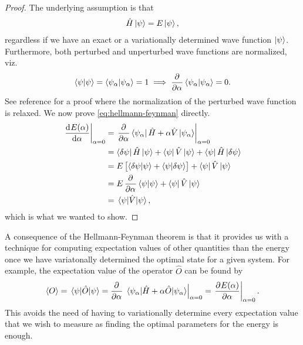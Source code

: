         \begin{proof}
            The underlying assumption is that
            \begin{align}
                \hat{H}\ket{\psi} = E\ket{\psi},
            \end{align}
            regardless if we have an exact or a variationally determined wave
            function $\ket{\psi}$.
            Furthermore, both perturbed and unperturbed wave functions are
            normalized, viz.
            \begin{align}
                \braket{\psi}{\psi} = \braket{\psi_{\alpha}}{\psi_{\alpha}} = 1
                \implies
                \dpd[]{}{\alpha} \braket{\psi_{\alpha}}{\psi_{\alpha}} = 0.
            \end{align}
            See reference \cite{helgaker-molecular} for a proof where the
            normalization of the perturbed wave function is relaxed.
            We now prove \autoref{eq:hellmann-feynman} directly.
            \begin{align}
                \left.\dod[]{E(\alpha)}{\alpha}\right\rvert_{\alpha = 0}
                &=
                \left.
                \dpd[]{}{\alpha}
                \bra{\psi_{\alpha}}\hamil + \alpha\hat{V}\ket{\psi_{\alpha}}
                \right\rvert_{\alpha = 0}
                \\
                &=
                \bra{\delta\psi}\hamil\ket{\psi}
                + \bra{\psi}\hat{V}\ket{\psi}
                + \bra{\psi}\hamil\ket{\delta\psi}
                \\
                &=
                \energy \brak{
                    \braket{\delta\psi}{\psi}
                    + \braket{\psi}{\delta\psi}
                }
                + \bra{\psi}\hat{V}\ket{\psi}
                \\
                &=
                \energy \dpd[]{}{\alpha}\braket{\psi}{\psi}
                + \bra{\psi}\hat{V}\ket{\psi}
                \\
                &=
                \mel{\psi}{\hat{V}}{\psi},
            \end{align}
            which is what we wanted to show.
        \end{proof}
        A consequence of the Hellmann-Feynman theorem is that it provides us
        with a technique for computing expectation values of other quantities
        than the energy once we have variatonally determined the optimal state
        for a given system.
        For example, the expectation value of the operator $\hat{O}$ can be
        found by
        \begin{align}
            \expval{O}
            = \mel{\psi}{\hat{O}}{\psi}
            = \dpd[]{}{\alpha}
            \left.
            \mel{\psi_{\alpha}}{\hamil + \alpha\hat{O}}{\psi_{\alpha}}
            \right\rvert_{\alpha = 0}
            =
            \left.
            \dpd[]{E(\alpha)}{\alpha}
            \right\rvert_{\alpha = 0}.
        \end{align}
        This avoids the need of having to variationally determine every
        expectation value that we wish to measure as finding the optimal
        parameters for the energy is enough.

